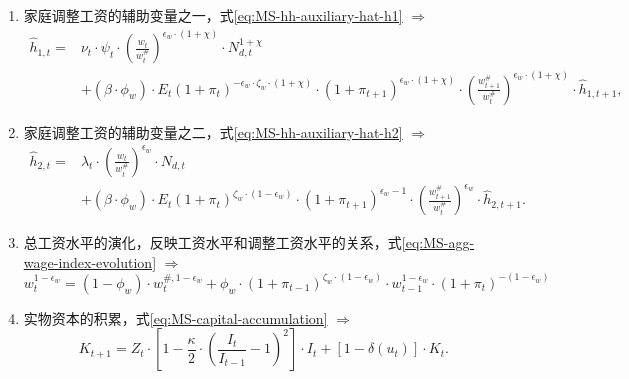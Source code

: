 \begin{enumerate}
\item 家庭调整工资的辅助变量之一，式\eqref{eq:MS-hh-auxiliary-hat-h1} $\Rightarrow$
\begin{equation*}
\begin{split}
\hat{h}_{1,t} =& \nu_t \cdot \psi_t \cdot \left(\frac{w_t}{w_t^{\#}}\right)^{\epsilon_w \cdot \left(1+\chi \right)} \cdot N_{d,t}^{1+\chi} \\
&+ \left(\beta \cdot \phi_w \right) \cdot E_t \left( 1+\pi_t \right)^{-\epsilon_w \cdot \zeta_w \cdot (1+\chi)} \cdot \left(1+\pi_{t+1} \right)^{\epsilon_w \cdot \left(1+\chi \right)}\cdot \left(\frac{w^{\#}_{t+1}}{w^{\#}_{t}}\right)^{\epsilon_w \cdot \left( 1 + \chi \right)} \cdot \hat{h}_{1,t+1},
\end{split}
\end{equation*}

\item 家庭调整工资的辅助变量之二，式\eqref{eq:MS-hh-auxiliary-hat-h2} $\Rightarrow$
\begin{equation*}
\begin{split}
\hat{h}_{2,t} = & \lambda_t \cdot \left(\frac{w_t}{w_t^{\#}}\right)^{\epsilon_w} \cdot N_{d,t} \\
&+ \left(\beta \cdot \phi_w \right) \cdot E_t \left( 1+\pi_t \right)^{\zeta_w \cdot (1-\epsilon_w)} \cdot \left(1 + \pi_{t+1} \right)^{\epsilon_w -1} \cdot \left(\frac{w^{\#}_{t+1}}{w^{\#}_{t}}\right)^{\epsilon_w} \cdot \hat{h}_{2,t+1}.
\end{split}
\end{equation*}

\item 总工资水平的演化，反映工资水平和调整工资水平的关系，式\eqref{eq:MS-agg-wage-index-evolution} $\Rightarrow$
\begin{equation*}
w_t^{1-\epsilon_w} = \left( 1-\phi_w \right) \cdot w_t^{\#, 1-\epsilon_w} + \phi_w \cdot \left(1+\pi_{t-1}\right)^{\zeta_w \cdot \left(1-\epsilon_w\right)} \cdot w_{t-1}^{1-\epsilon_w} \cdot \left(1 + \pi_t\right)^{- \left(1 - \epsilon_w \right)}
\end{equation*}

\item 实物资本的积累，式\eqref{eq:MS-capital-accumulation} $\Rightarrow$
\begin{equation*}
K_{t+1} = Z_t \cdot \left[
1 - \frac{\kappa}{2} \cdot \left(\frac{I_t}{I_{t-1}} -1\right)^2
\right] \cdot I_t + \left[
1- \delta(u_t)
\right] \cdot K_t.
\end{equation*}


\end{enumerate}
